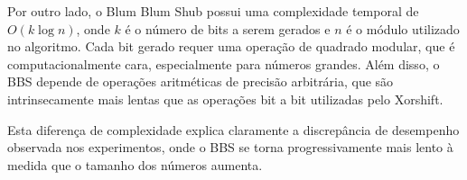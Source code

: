 Por outro lado, o Blum Blum Shub possui uma complexidade temporal de $O(k \log n)$, onde $k$ é o número de bits a serem gerados e $n$ é o módulo utilizado no algoritmo. Cada bit gerado requer uma operação de quadrado modular, que é computacionalmente cara, especialmente para números grandes. Além disso, o BBS depende de operações aritméticas de precisão arbitrária, que são intrinsecamente mais lentas que as operações bit a bit utilizadas pelo Xorshift.

Esta diferença de complexidade explica claramente a discrepância de desempenho observada nos experimentos, onde o BBS se torna progressivamente mais lento à medida que o tamanho dos números aumenta.
